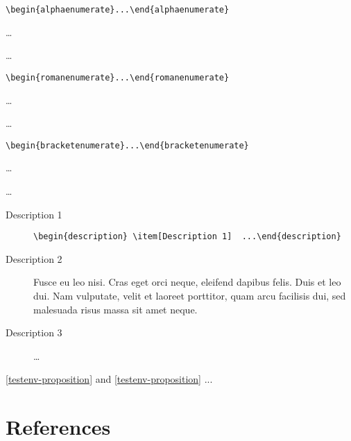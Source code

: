 \documentclass[
  a4paper,
  oneside,         %
  UKenglish,       %
  cleveref,        %
  autoref,         %
  thm-restate      %
]{lipics-v2021}
\begin{document}
\begin{alphaenumerate}
\item \verb|\begin{alphaenumerate}...\end{alphaenumerate}|
\item \dots
\item \dots
\end{alphaenumerate}

\begin{romanenumerate}
\item \verb|\begin{romanenumerate}...\end{romanenumerate}|
\item \dots
\item \dots
\end{romanenumerate}

\begin{bracketenumerate}
\item \verb|\begin{bracketenumerate}...\end{bracketenumerate}|
\item \dots
\item \dots
\end{bracketenumerate}

\begin{description}
\item[Description 1] \verb|\begin{description} \item[Description 1]  ...\end{description}|
\item[Description 2] Fusce eu leo nisi. Cras eget orci neque, eleifend dapibus felis. Duis et leo dui. Nam vulputate, velit et laoreet porttitor, quam arcu facilisis dui, sed malesuada risus massa sit amet neque.
\item[Description 3]  \dots
\end{description}

\cref{testenv-proposition} and \autoref{testenv-proposition} ...

\section{References}\label{sec:theorem-environments}
\end{document}
